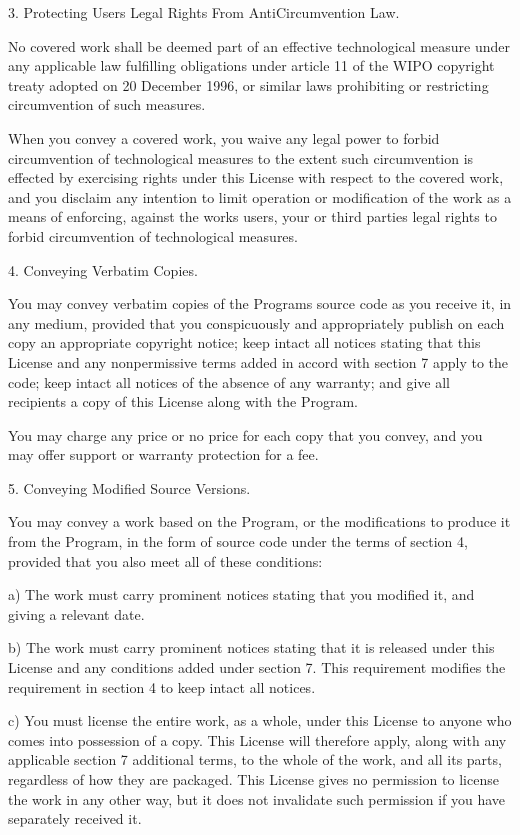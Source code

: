 \documentclass[a4paper,10pt,english]{sphinxmanual}
\begin{document}
\begin{sphinxVerbatim}[commandchars=\\\{\}]
  3. Protecting Users\PYGZsq{} Legal Rights From Anti\PYGZhy{}Circumvention Law.

  No covered work shall be deemed part of an effective technological
measure under any applicable law fulfilling obligations under article
11 of the WIPO copyright treaty adopted on 20 December 1996, or
similar laws prohibiting or restricting circumvention of such
measures.

  When you convey a covered work, you waive any legal power to forbid
circumvention of technological measures to the extent such circumvention
is effected by exercising rights under this License with respect to
the covered work, and you disclaim any intention to limit operation or
modification of the work as a means of enforcing, against the work\PYGZsq{}s
users, your or third parties\PYGZsq{} legal rights to forbid circumvention of
technological measures.

  4. Conveying Verbatim Copies.

  You may convey verbatim copies of the Program\PYGZsq{}s source code as you
receive it, in any medium, provided that you conspicuously and
appropriately publish on each copy an appropriate copyright notice;
keep intact all notices stating that this License and any
non\PYGZhy{}permissive terms added in accord with section 7 apply to the code;
keep intact all notices of the absence of any warranty; and give all
recipients a copy of this License along with the Program.

  You may charge any price or no price for each copy that you convey,
and you may offer support or warranty protection for a fee.

  5. Conveying Modified Source Versions.

  You may convey a work based on the Program, or the modifications to
produce it from the Program, in the form of source code under the
terms of section 4, provided that you also meet all of these conditions:

    a) The work must carry prominent notices stating that you modified
    it, and giving a relevant date.

    b) The work must carry prominent notices stating that it is
    released under this License and any conditions added under section
    7.  This requirement modifies the requirement in section 4 to
    \PYGZdq{}keep intact all notices\PYGZdq{}.

    c) You must license the entire work, as a whole, under this
    License to anyone who comes into possession of a copy.  This
    License will therefore apply, along with any applicable section 7
    additional terms, to the whole of the work, and all its parts,
    regardless of how they are packaged.  This License gives no
    permission to license the work in any other way, but it does not
    invalidate such permission if you have separately received it.


\end{sphinxVerbatim}
\end{document}
